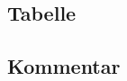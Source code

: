 		
		\subsection{Tabelle}
		\label{subsec:table}
		
		\subsection{Kommentar}
		\label{subsec:comment}
	
	
	
		
